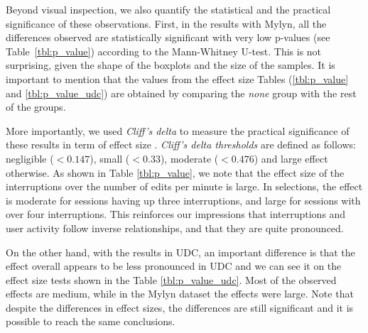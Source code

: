 \documentclass[times]{smrauth}
\begin{document}
Beyond visual inspection, we also quantify the statistical and the practical significance of these observations. First, in the results with Mylyn, all the differences observed are statistically significant with very low p-values (see Table~\ref{tbl:p_value}) according to the Mann-Whitney U-test. This is not surprising, given the shape of the boxplots and the size of the samples. It is important to mention that the values from the effect size Tables (\ref{tbl:p_value} and \ref{tbl:p_value_udc}) are obtained by comparing the \textit{none} group with the rest of the groups.


More importantly, we used \textit{Cliff's delta} to measure the practical significance of these results in term of effect size %
\cite{C94}. \textit{Cliff's delta thresholds} are defined as follows: negligible ($<0.147$), small  ($<0.33$), moderate ($<0.476$) and large effect otherwise. As shown in Table \ref{tbl:p_value}, we note that the effect size of the interruptions over the number of edits per minute is large. In selections, the effect is moderate for sessions having up three interruptions, and large for sessions with over four interruptions. This reinforces our impressions that interruptions and user activity follow inverse relationships, and that they are quite pronounced.

On the other hand, with the results in UDC, an important difference is that the effect overall appears to be less pronounced in UDC and we can see it on the effect size tests shown in the Table \ref{tbl:p_value_udc}. Most of the observed effects are medium, while in the Mylyn dataset the effects were large. Note that despite the differences in effect sizes, the differences are still significant and it is possible to reach the same conclusions.

\end{document}
